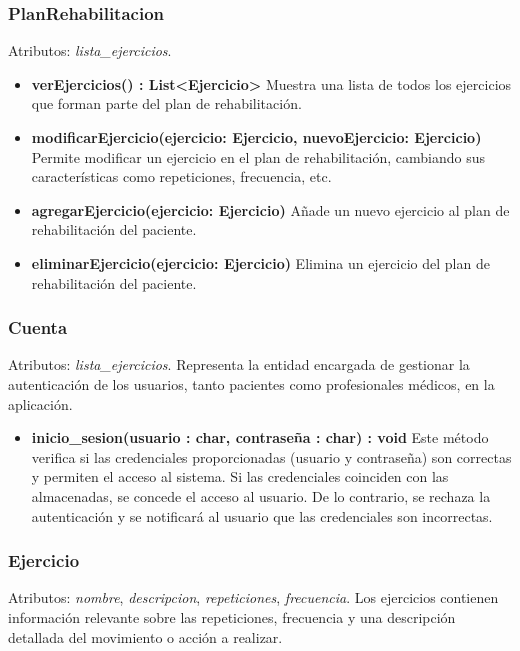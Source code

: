 \documentclass{article}
\begin{document}
\subsubsection*{PlanRehabilitacion}
Atributos: \textit{lista\_ejercicios}.
\begin{itemize}
	\item \textbf{verEjercicios() : List<Ejercicio>}  
	Muestra una lista de todos los ejercicios que forman parte del plan de rehabilitación.
	
	\item \textbf{modificarEjercicio(ejercicio: Ejercicio, nuevoEjercicio: Ejercicio)}  
	Permite modificar un ejercicio en el plan de rehabilitación, cambiando sus características como repeticiones, frecuencia, etc.
	
	\item \textbf{agregarEjercicio(ejercicio: Ejercicio)}  
	Añade un nuevo ejercicio al plan de rehabilitación del paciente.
	
	\item \textbf{eliminarEjercicio(ejercicio: Ejercicio)}  
	Elimina un ejercicio del plan de rehabilitación del paciente.
\end{itemize}

\subsubsection*{Cuenta}
Atributos: \textit{lista\_ejercicios}.
Representa la entidad encargada de gestionar la autenticación de los usuarios, tanto pacientes como profesionales médicos, en la aplicación.
\begin{itemize}
	\item \textbf{inicio\_sesion(usuario : char, contraseña : char) : void}
	Este método verifica si las credenciales proporcionadas (usuario y contraseña) son correctas y permiten el acceso al sistema. Si las credenciales coinciden con las almacenadas, se concede el acceso al usuario. De lo contrario, se rechaza la autenticación y se notificará al usuario que las credenciales son incorrectas.
\end{itemize}

\subsubsection*{Ejercicio}
Atributos: \textit{nombre}, \textit{descripcion}, \textit{repeticiones}, \textit{frecuencia}.  
Los ejercicios contienen información relevante sobre las repeticiones, frecuencia y una descripción detallada del movimiento o acción a realizar.
\end{document}
